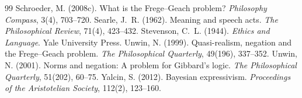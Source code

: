 \documentclass{situationist-preprint}
\begin{document}
\begin{thebibliography}{99}
 Schroeder, M. (2008c). What is the Frege--Geach problem? \emph{Philosophy Compass}, 3(4), 703--720.
 Searle, J.~R. (1962). Meaning and speech acts. \emph{The Philosophical Review}, 71(4), 423--432.
 Stevenson, C.~L. (1944). \emph{Ethics and Language}. Yale University Press.
 Unwin, N. (1999). Quasi-realism, negation and the Frege--Geach problem. \emph{The Philosophical Quarterly}, 49(196), 337--352.
 Unwin, N. (2001). Norms and negation: A problem for Gibbard's logic. \emph{The Philosophical Quarterly}, 51(202), 60--75.
 Yalcin, S. (2012). Bayesian expressivism. \emph{Proceedings of the Aristotelian Society}, 112(2), 123--160.
\end{thebibliography}
\end{document}

